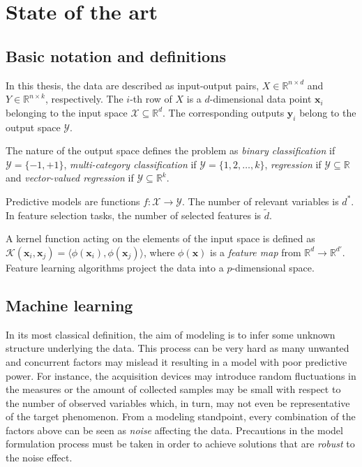 
\chapter{State of the art} \label{chap:state-of-the-art}

\section{Basic notation and definitions} \label{sec:notation}
In this thesis, the data are described as input-output pairs, $X \in \mathbb{R}^{n \times d}$ and $Y \in \mathbb{R}^{n \times k}$, respectively.
The $i$-th row of $X$ is a $d$-dimensional data point $\bm{x}_{i}$ belonging to the input space $\mathcal{X}\subseteq\mathds{R}^d$. The corresponding outputs $\bm{y}_{i}$ belong to the output space $\mathcal{Y}$.

The nature of the output space defines the problem as {\sl binary classification} if  $\mathcal{Y} = \{-1,+1\}$, {\sl multi-category classification} if $\mathcal{Y} = \{1,2,\dots,k\}$, {\sl regression} if $\mathcal{Y}\subseteq\mathds{R}$ and {\sl vector-valued regression} if $\mathcal{Y}\subseteq\mathds{R}^k$.

Predictive models are functions $f: \mathcal{X} \rightarrow \mathcal{Y}$.
The number of relevant variables is $d^*$.
In feature selection tasks, the number of selected features is $\tilde d$.

A kernel function acting on the elements of the input space is defined as $\mathcal{K}(\bm{x}_{i},\bm{x}_{j})=\langle \phi(\bm{x}_{i}), \phi(\bm{x}_{j})\rangle$, where $\phi(\bm{x})$ is a {\em feature map} from $\mathds{R}^d \rightarrow \mathds{R}^{d'}$.
Feature learning algorithms project the data into a $p$-dimensional space.

\section{Machine learning} \label{sec:machine_learning}
In its most classical definition, the aim of modeling is to infer some unknown structure underlying the data. This process can be very hard as many unwanted and concurrent factors may mislead it resulting in a model with poor predictive power.  For instance, the acquisition devices may introduce random fluctuations in the measures or the amount of collected samples may be small with respect to the number of observed variables which, in turn, may not even be representative of the target phenomenon. From a modeling standpoint, every combination of the factors above can be seen as \textit{noise} affecting the data.
Precautions in the model formulation process must be taken in order to achieve solutions that are \textit{robust} to the noise effect.


